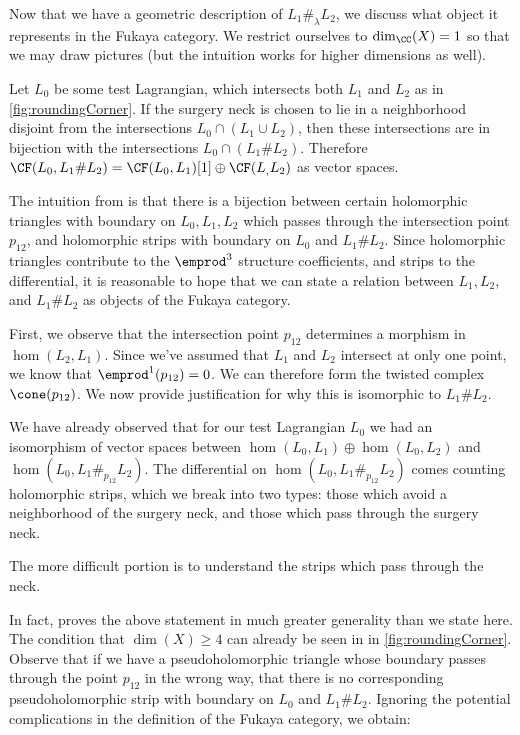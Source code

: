 


Now that we have a geometric description of $L_1\#_\lambda L_2$, we discuss what object it represents in the Fukaya category. We restrict ourselves to $\dim_\CC(X)=1$ so that we may draw pictures (but the intuition works for higher dimensions as well).

Let $L_0$ be some test Lagrangian, which intersects both $L_1$ and $L_2$ as in \cref{fig:roundingCorner}. If the surgery neck is chosen to lie in a neighborhood disjoint from the intersections  $L_0\cap (L_1\cup L_2)$, then these intersections are in bijection with the intersections $L_0\cap (L_1\# L_2)$. Therefore $\CF(L_0, L_1\# L_2)=\CF(L_0, L_1)[1]\oplus \CF(L_, L_2)$ as vector spaces.

 The intuition from \cite{fukaya2007lagrangian} is that there is a bijection between certain holomorphic triangles with boundary on $L_0, L_1, L_2$ which passes through the intersection point $p_{12}$, and holomorphic strips with boundary on $L_0$ and $L_1\# L_2$. Since holomorphic triangles contribute to the $\emprod^3$ structure coefficients, and strips to the differential, it is reasonable to hope that we can state a relation between $L_1, L_2,$ and $L_1\#L_2$ as objects of the Fukaya category.


First, we observe that the intersection point $p_{12}$ determines a morphism in $\hom(L_2, L_1)$. Since we've assumed that $L_1$ and $L_2$ intersect at only one point, we know that $\emprod^1(p_{12})=0$. We can therefore form the twisted complex $\cone(p_{12})$. We now provide justification for why this is isomorphic to $L_1\# L_2$.

We have already observed that for our test Lagrangian $L_0$ we had an isomorphism of vector spaces between $\hom(L_0, L_1)\oplus \hom(L_0, L_2)$ and $\hom(L_0, L_1\#_{p_{12}}L_2)$. The differential on $\hom(L_0, L_1\#_{p_{12}}L_2)$ comes counting holomorphic strips, which we break into two types: those which avoid a neighborhood of the surgery neck, and those which pass through the surgery neck. 

The more difficult portion is to understand the strips which pass through the neck.

In fact, \cite{fukaya2007lagrangian} proves the above statement in much greater generality than we state here. The condition that $\dim(X)\geq 4$ can already be seen in in \cref{fig:roundingCorner}. Observe that if we have a pseudoholomorphic triangle whose boundary passes through the point $p_{12}$ in the wrong way, that there is no corresponding pseudoholomorphic strip with boundary on $L_0$ and $L_1\# L_2$.
Ignoring the potential complications in the definition of the Fukaya category, we obtain:

